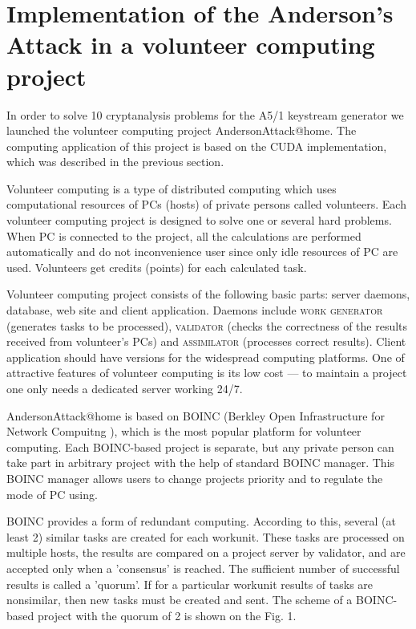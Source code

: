 \documentclass[runningheads,a4paper]{llncs}[2015/06/24]
\begin{document}
\section{Implementation of the Anderson's Attack in a volunteer computing
project}\label{sec:boinc}
In order to solve 10 cryptanalysis problems for the A5/1 keystream generator we
launched the volunteer computing project AndersonAttack@home. The computing
application of this project is based on the CUDA implementation, which was
described in the previous section.

Volunteer computing is a type of distributed computing which uses computational
resources of PCs (hosts) of private persons called volunteers. Each volunteer
computing project is designed to solve one or several hard problems. When PC is
connected to the project, all the calculations are performed automatically and
do not inconvenience user since only idle resources of PC are used. Volunteers
get credits (points) for each calculated task. 

Volunteer computing project consists of the following basic parts: server
daemons, database, web site and client application. Daemons include
\textsc{work generator} (generates tasks to be processed), \textsc{validator}
(checks the correctness of the results received from volunteer's PCs) and
\textsc{assimilator} (processes correct results). Client application should
have versions for the widespread computing platforms.  One of attractive
features of volunteer computing is its low cost --- to maintain a project one
only needs a dedicated server working 24/7.

AndersonAttack@home is based on BOINC (Berkley Open Infrastructure for Network
Compuitng \cite{DANDERSON2004}), which is the most popular platform for
volunteer computing. Each BOINC-based project is separate, but any private
person can take part in arbitrary project with the help of standard BOINC
manager. This BOINC manager allows users to change projects priority and to
regulate the mode of PC using. 

BOINC provides a form of redundant computing.  According to this, several (at
least 2) similar tasks are created for each workunit. These tasks are processed
on multiple hosts, the results are compared on a project server by validator,
and are accepted only when a 'consensus' is reached. The sufficient number of
successful results is called a 'quorum'. If for a particular workunit results
of tasks are nonsimilar, then new tasks must be created and sent. The scheme of
a BOINC-based project with the quorum of 2 is shown on the Fig. 1.
\end{document}
